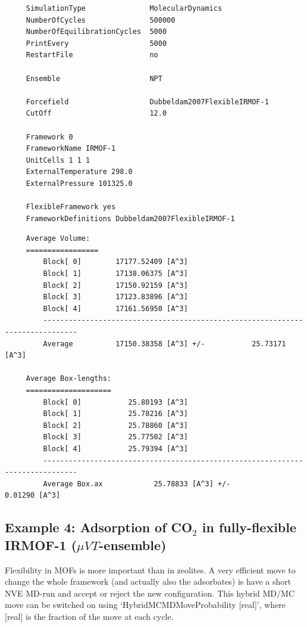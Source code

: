 \begin{tiny}
\begin{verbatim}
     SimulationType               MolecularDynamics
     NumberOfCycles               500000
     NumberOfEquilibrationCycles  5000
     PrintEvery                   5000
     RestartFile                  no
     
     Ensemble                     NPT
     
     Forcefield                   Dubbeldam2007FlexibleIRMOF-1
     CutOff                       12.0
     
     Framework 0
     FrameworkName IRMOF-1
     UnitCells 1 1 1
     ExternalTemperature 298.0
     ExternalPressure 101325.0
     
     FlexibleFramework yes
     FrameworkDefinitions Dubbeldam2007FlexibleIRMOF-1
\end{verbatim}
\end{tiny}

\begin{tiny}
\begin{verbatim}
     Average Volume:
     =================
         Block[ 0]        17177.52409 [A^3]
         Block[ 1]        17138.06375 [A^3]
         Block[ 2]        17150.92159 [A^3]
         Block[ 3]        17123.83896 [A^3]
         Block[ 4]        17161.56950 [A^3]
         ------------------------------------------------------------------------------
         Average          17150.38358 [A^3] +/-           25.73171 [A^3]
     
     Average Box-lengths:
     ====================
         Block[ 0]           25.80193 [A^3]
         Block[ 1]           25.78216 [A^3]
         Block[ 2]           25.78860 [A^3]
         Block[ 3]           25.77502 [A^3]
         Block[ 4]           25.79394 [A^3]
         ------------------------------------------------------------------------------
         Average Box.ax            25.78833 [A^3] +/-            0.01290 [A^3]
\end{verbatim}
\end{tiny}


\subsection*{Example 4: Adsorption of CO$_2$ in fully-flexible IRMOF-1 ($\mu VT$-ensemble)}

Flexibility in MOFs is more important than in zeolites. A very efficient move to change the whole framework (and actually
also the adsorbates) is have a short NVE MD-run and accept or reject the new configuration. This hybrid MD/MC move can be switched on using
`HybridMCMDMoveProbability  [real]', where [real] is the fraction of the move at each cycle.

